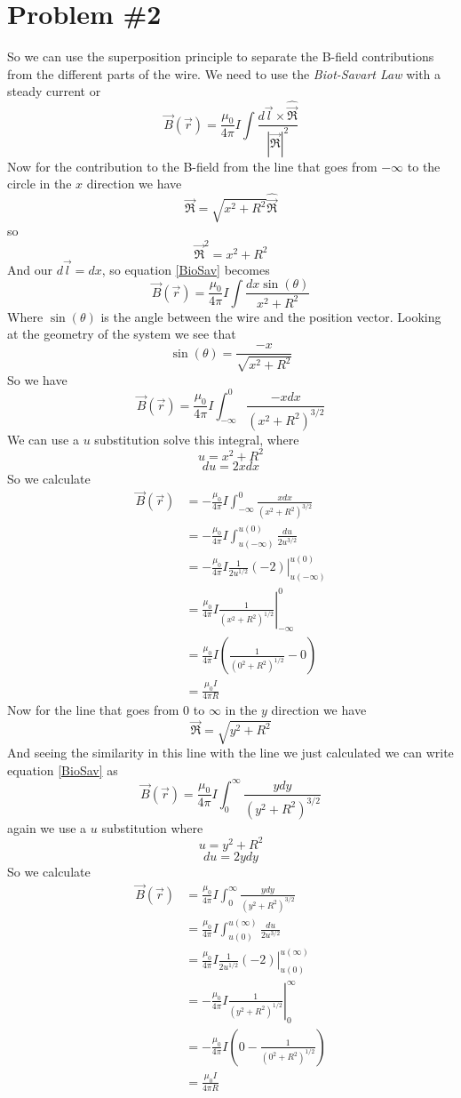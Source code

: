 \documentclass[11pt]{article}
\numberwithin{equation}{section}
\newcommand{\scrptR}{\vec{\mathfrak{R}}}
\begin{document}
\section{Problem \#2}
So we can use the superposition principle to separate the B-field contributions from the different parts of the wire. We need to use the \emph{Biot-Savart Law} with a steady current or
\begin{equation}
\vec{B}(\vec{r}) = \frac{\mu_0}{4\pi} I\int \frac{d\vec{l}\times\hat{\scrptR}}{|\scrptR|^2}
\label{BioSav}
\end{equation}
Now for the contribution to the B-field from the line that goes from $-\infty$ to the circle in the $x$ direction we have
$$\scrptR = \sqrt{x^2+R^2}\hat{\scrptR}$$
so 
$$\scrptR^2 = x^2+R^2$$
And our $d\vec{l} = dx$, so equation \ref{BioSav} becomes 
$$\vec{B}(\vec{r}) = \frac{\mu_0}{4\pi} I\int \frac{dx\sin(\theta)}{x^2+R^2}$$
Where $\sin(\theta)$ is the angle between the wire and the position vector. Looking at the geometry of the system we see that
$$\sin(\theta) = \frac{-x}{\sqrt{x^2+R^2}}$$
So we have
$$\vec{B}(\vec{r}) = \frac{\mu_0}{4\pi} I\int_{-\infty}^{0} \frac{-x dx}{(x^2+R^2)^{3/2}}$$
We can use a $u$ substitution solve this integral, where
$$u=x^2+R^2$$
$$du=2xdx$$
So we calculate
\begin{align*}
\vec{B}(\vec{r}) &= -\frac{\mu_0}{4\pi} I\int_{-\infty}^{0} \frac{x dx}{(x^2+R^2)^{3/2}}\\
&= -\frac{\mu_0}{4\pi} I\int_{u(-\infty)}^{u(0)} \frac{du}{2u^{3/2}}\\
&= -\frac{\mu_0}{4\pi} I \left.\frac{1}{2u^{1/2}}(-2)\right|_{u(-\infty)}^{u(0)}\\
&= \frac{\mu_0}{4\pi} I \left.\frac{1}{(x^2+R^2)^{1/2}}\right|_{-\infty}^{0}\\
&= \frac{\mu_0}{4\pi} I \left(\frac{1}{(0^2+R^2)^{1/2}}-0\right)\\
&= \frac{\mu_0I}{4\pi R}
\end{align*}
Now for the line that goes from $0$ to $\infty$ in the $y$ direction we have
$$\scrptR = \sqrt{y^2+R^2}$$
And seeing the similarity in this line with the line we just calculated we can write equation \ref{BioSav} as
$$\vec{B}(\vec{r}) = \frac{\mu_0}{4\pi} I\int_0^{\infty} \frac{y dy}{(y^2+R^2)^{3/2}}$$
again we use a $u$ substitution where
$$u=y^2+R^2$$
$$du=2ydy$$
So we calculate
\begin{align*}
\vec{B}(\vec{r}) &= \frac{\mu_0}{4\pi} I\int_0^{\infty} \frac{y dy}{(y^2+R^2)^{3/2}}\\
&= \frac{\mu_0}{4\pi} I\int_{u(0)}^{u(\infty)} \frac{du}{2u^{3/2}}\\
&= \frac{\mu_0}{4\pi} I \left.\frac{1}{2u^{1/2}}(-2)\right|_{u(0)}^{u(\infty)}\\
&= -\frac{\mu_0}{4\pi} I \left.\frac{1}{(y^2+R^2)^{1/2}}\right|_0^{\infty}\\
&= -\frac{\mu_0}{4\pi} I \left(0-\frac{1}{(0^2+R^2)^{1/2}}\right)\\
&= \frac{\mu_0I}{4\pi R}
\end{align*}
\end{document}
